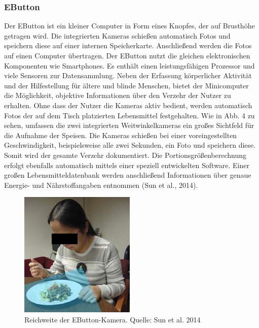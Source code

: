 \subsubsection{EButton}

Der EButton ist ein kleiner Computer in Form eines Knopfes, der auf Brusthöhe getragen wird. Die integrierten Kameras schießen automatisch Fotos und speichern diese auf einer internen Speicherkarte. Anschließend werden die Fotos auf einen Computer übertragen. Der EButton nutzt die gleichen elektronischen Komponenten wie Smartphones. Es enthält einen leistungsfähigen Prozessor und viele Sensoren zur Datensammlung. Neben der Erfassung körperlicher Aktivität und der Hilfestellung für ältere und blinde Menschen, bietet der Minicomputer die Möglichkeit, objektive Informationen über den Verzehr der Nutzer zu erhalten.
Ohne dass der Nutzer die Kameras aktiv bedient, werden automatisch Fotos der auf dem Tisch platzierten Lebensmittel festgehalten. Wie in Abb. 4 zu sehen, umfassen die zwei integrierten  Weitwinkelkameras ein großes Sichtfeld für die Aufnahme der Speisen. Die Kameras schießen bei einer voreingestellten Geschwindigkeit, beispielsweise alle zwei Sekunden, ein Foto und speichern diese. Somit wird der gesamte Verzehr dokumentiert. Die Portionsgrößenberechnung erfolgt ebenfalls automatisch mittels einer speziell entwickelten Software. Einer großen Lebensmitteldatenbank werden anschließend Informationen über genaue Energie- und Nährstoffangaben entnommen (Sun et al., 2014). 


\begin{figure}[h]
	\centering
	\includegraphics{Bilder/EButton.png}
	\caption[Reichweite der EButton-Kamera]{Reichweite der EButton-Kamera. Quelle: Sun et al. 2014}
	\label{bild3}
\end{figure}


